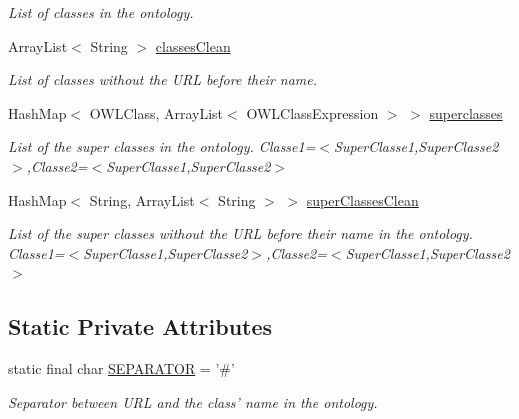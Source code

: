 \begin{DoxyCompactItemize}
\begin{DoxyCompactList}\small\item\em List of classes in the ontology. \end{DoxyCompactList}\item 
\hypertarget{class_ontology_1_1_ontology_a35b7af950c4bd1f698fcf18cb38f4e02}{
ArrayList$<$ String $>$ \hyperlink{class_ontology_1_1_ontology_a35b7af950c4bd1f698fcf18cb38f4e02}{classesClean}}
\label{class_ontology_1_1_ontology_a35b7af950c4bd1f698fcf18cb38f4e02}

\begin{DoxyCompactList}\small\item\em List of classes without the URL before their name. \end{DoxyCompactList}\item 
\hypertarget{class_ontology_1_1_ontology_a0a5224da294ff4af352081031305f799}{
HashMap$<$ OWLClass, ArrayList$<$ OWLClassExpression $>$ $>$ \hyperlink{class_ontology_1_1_ontology_a0a5224da294ff4af352081031305f799}{superclasses}}
\label{class_ontology_1_1_ontology_a0a5224da294ff4af352081031305f799}

\begin{DoxyCompactList}\small\item\em List of the super classes in the ontology.  Classe1=$<$SuperClasse1,SuperClasse2$>$,Classe2=$<$SuperClasse1,SuperClasse2$>$ \end{DoxyCompactList}\item 
\hypertarget{class_ontology_1_1_ontology_a08165d8cd889ef937321671134aae060}{
HashMap$<$ String, ArrayList$<$ String $>$ $>$ \hyperlink{class_ontology_1_1_ontology_a08165d8cd889ef937321671134aae060}{superClassesClean}}
\label{class_ontology_1_1_ontology_a08165d8cd889ef937321671134aae060}

\begin{DoxyCompactList}\small\item\em List of the super classes without the URL before their name in the ontology.  Classe1=$<$SuperClasse1,SuperClasse2$>$,Classe2=$<$SuperClasse1,SuperClasse2$>$ \end{DoxyCompactList}\end{DoxyCompactItemize}
\subsection*{Static Private Attributes}
\begin{DoxyCompactItemize}
\item 
\hypertarget{class_ontology_1_1_ontology_a29aacc9f40d4659c925e80641995a561}{
static final char \hyperlink{class_ontology_1_1_ontology_a29aacc9f40d4659c925e80641995a561}{SEPARATOR} = '\#'}
\label{class_ontology_1_1_ontology_a29aacc9f40d4659c925e80641995a561}

\begin{DoxyCompactList}\small\item\em Separator between URL and the class' name in the ontology. \end{DoxyCompactList}\end{DoxyCompactItemize}


